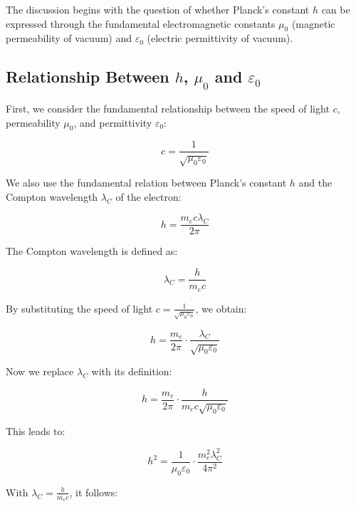 \documentclass{article}
\begin{document}
	The discussion begins with the question of whether Planck's constant $h$ can be expressed through the fundamental electromagnetic constants $\mu_0$ (magnetic permeability of vacuum) and $\varepsilon_0$ (electric permittivity of vacuum).
	
	\subsection{Relationship Between $h$, $\mu_0$ and $\varepsilon_0$}
	
	First, we consider the fundamental relationship between the speed of light $c$, permeability $\mu_0$, and permittivity $\varepsilon_0$:
	
	\begin{equation}
		c = \frac{1}{\sqrt{\mu_0\varepsilon_0}}
	\end{equation}
	
	We also use the fundamental relation between Planck's constant $h$ and the Compton wavelength $\lambda_C$ of the electron:
	
	\begin{equation}
		h = \frac{m_e c \lambda_C}{2\pi}
	\end{equation}
	
	The Compton wavelength is defined as:
	
	\begin{equation}
		\lambda_C = \frac{h}{m_e c}
	\end{equation}
	
	By substituting the speed of light $c = \frac{1}{\sqrt{\mu_0\varepsilon_0}}$, we obtain:
	
	\begin{equation}
		h = \frac{m_e}{2\pi} \cdot \frac{\lambda_C}{\sqrt{\mu_0\varepsilon_0}}
	\end{equation}
	
	Now we replace $\lambda_C$ with its definition:
	
	\begin{equation}
		h = \frac{m_e}{2\pi} \cdot \frac{h}{m_e c \sqrt{\mu_0\varepsilon_0}}
	\end{equation}
	
	This leads to:
	
	\begin{equation}
		h^2 = \frac{1}{\mu_0\varepsilon_0} \cdot \frac{m_e^2 \lambda_C^2}{4\pi^2}
	\end{equation}
	
	With $\lambda_C = \frac{h}{m_e c}$, it follows:
	
\end{document}
